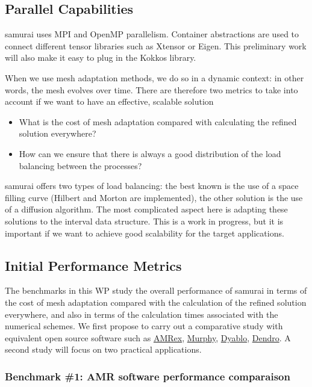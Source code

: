 \subsection{Parallel Capabilities}
\label{sec:WP1:Samurai:performances}

samurai uses MPI and OpenMP parallelism. Container abstractions are used to connect different tensor libraries such as Xtensor or Eigen. This preliminary work will also make it easy to plug in the Kokkos library.

When we use mesh adaptation methods, we do so in a dynamic context: in other words, the mesh evolves over time. There are therefore two metrics to take into account if we want to have an effective, scalable solution
\begin{itemize}
\item What is the cost of mesh adaptation compared with calculating the refined solution everywhere?
\item How can we ensure that there is always a good distribution of the load balancing between the processes?
\end{itemize}

samurai offers two types of load balancing: the best known is the use of a space filling curve (Hilbert and Morton are implemented), the other solution is the use of a diffusion algorithm. The most complicated aspect here is adapting these solutions to the interval data structure. This is a work in progress, but it is important if we want to achieve good scalability for the target applications.

\subsection{Initial Performance Metrics}
\label{sec:WP1:Samurai:metrics}

The benchmarks in this WP study the overall performance of samurai in terms of the cost of mesh adaptation compared with the calculation of the refined solution everywhere, and also in terms of the calculation times associated with the numerical schemes. We first propose to carry out a comparative study with equivalent open source software such as \href{https://github.com/AMReX-Codes/amrex}{AMRex}, \href{https://github.com/vanreeslab/murphy}{Murphy}, \href{https://github.com/Dyablo-HPC/Dyablo}{Dyablo}, \href{https://github.com/paralab/Dendro-5.01}{Dendro}. A second study will focus on two practical applications.

\subsubsection{Benchmark \#1: AMR software performance comparaison}


